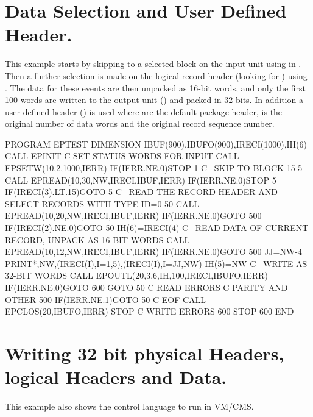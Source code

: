 \newpage

\section{Data Selection and User Defined Header.}

This example starts by skipping to a selected block on the input
unit  using  in . 
Then a further selection is
made on the logical record header (looking for ) 
using .
The data for these events are then unpacked as 16-bit words, and
only the first 100 words are written to the output unit ()
and packed in 32-bits. In addition a user defined header () is
used where  are the default package header,  is the
original number of data words and  the original record
sequence number.

\begin{XMP}
      PROGRAM EPTEST
      DIMENSION IBUF(900),IBUFO(900),IRECI(1000),IH(6)
      CALL EPINIT
 C       SET STATUS WORDS FOR INPUT
      CALL EPSETW(10,2,1000,IERR)
      IF(IERR.NE.0)STOP 1
 C--    SKIP TO BLOCK 15
    5 CALL EPREAD(10,30,NW,IRECI,IBUF,IERR)
      IF(IERR.NE.0)STOP 5
      IF(IRECI(3).LT.15)GOTO 5
 C-- READ THE RECORD HEADER AND SELECT RECORDS WITH TYPE ID=0
   50 CALL EPREAD(10,20,NW,IRECI,IBUF,IERR)
      IF(IERR.NE.0)GOTO 500
      IF(IRECI(2).NE.0)GOTO 50
      IH(6)=IRECI(4)
 C-- READ DATA OF CURRENT RECORD, UNPACK AS 16-BIT WORDS
      CALL EPREAD(10,12,NW,IRECI,IBUF,IERR)
      IF(IERR.NE.0)GOTO 500
      JJ=NW-4
      PRINT*,NW,(IRECI(I),I=1,5),(IRECI(I),I=JJ,NW)
      IH(5)=NW
 C-- WRITE AS 32-BIT WORDS
      CALL EPOUTL(20,3,6,IH,100,IRECI,IBUFO,IERR)
      IF(IERR.NE.0)GOTO 600
      GOTO 50
 C       READ ERRORS
 C         PARITY AND OTHER
  500 IF(IERR.NE.1)GOTO 50
 C         EOF
      CALL EPCLOS(20,IBUFO,IERR)
      STOP
 C       WRITE ERRORS
  600 STOP 600
      END
\end{XMP}

\newpage

\section{Writing 32 bit physical Headers, logical Headers and Data.}

This example also shows the control language to run in VM/CMS.

